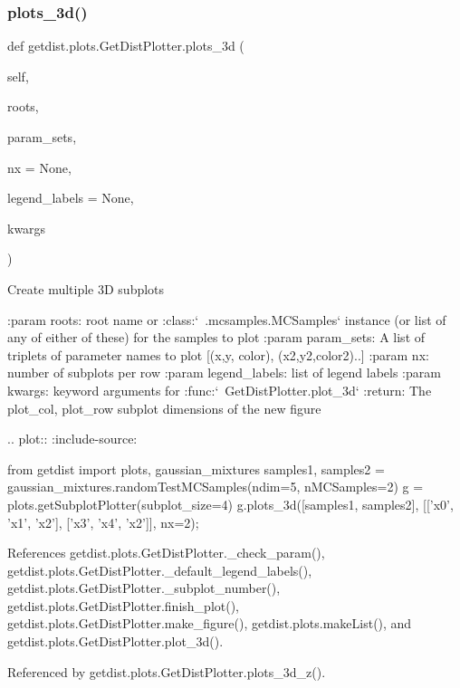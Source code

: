 \subsubsection{\texorpdfstring{plots\+\_\+3d()}{plots\_3d()}}
{\footnotesize\ttfamily def getdist.\+plots.\+Get\+Dist\+Plotter.\+plots\+\_\+3d (\begin{DoxyParamCaption}\item[{}]{self,  }\item[{}]{roots,  }\item[{}]{param\+\_\+sets,  }\item[{}]{nx = {\ttfamily None},  }\item[{}]{legend\+\_\+labels = {\ttfamily None},  }\item[{}]{kwargs }\end{DoxyParamCaption})}

\begin{DoxyVerb}Create multiple 3D subplots 

:param roots: root name or :class:`~.mcsamples.MCSamples` instance (or list of any of either of these) for the samples to plot
:param param_sets: A list of triplets of parameter names to plot [(x,y, color), (x2,y2,color2)..]
:param nx: number of subplots per row
:param legend_labels: list of legend labels
:param kwargs: keyword arguments for  :func:`~GetDistPlotter.plot_3d`
:return: The plot_col, plot_row subplot dimensions of the new figure

.. plot::
   :include-source:
   
    from getdist import plots, gaussian_mixtures
    samples1, samples2 = gaussian_mixtures.randomTestMCSamples(ndim=5, nMCSamples=2)
    g = plots.getSubplotPlotter(subplot_size=4)
    g.plots_3d([samples1, samples2], [['x0', 'x1', 'x2'], ['x3', 'x4', 'x2']], nx=2);
\end{DoxyVerb}
 

References getdist.\+plots.\+Get\+Dist\+Plotter.\+\_\+check\+\_\+param(), getdist.\+plots.\+Get\+Dist\+Plotter.\+\_\+default\+\_\+legend\+\_\+labels(), getdist.\+plots.\+Get\+Dist\+Plotter.\+\_\+subplot\+\_\+number(), getdist.\+plots.\+Get\+Dist\+Plotter.\+finish\+\_\+plot(), getdist.\+plots.\+Get\+Dist\+Plotter.\+make\+\_\+figure(), getdist.\+plots.\+make\+List(), and getdist.\+plots.\+Get\+Dist\+Plotter.\+plot\+\_\+3d().



Referenced by getdist.\+plots.\+Get\+Dist\+Plotter.\+plots\+\_\+3d\+\_\+z().

